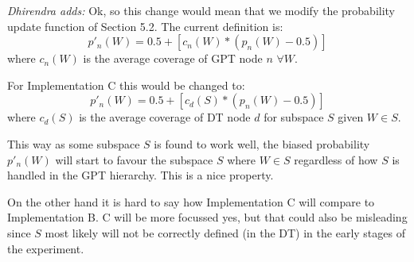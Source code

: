 \documentclass[10pt,a4paper]{article}
\begin{document}
\textit{Dhirendra adds:} Ok, so this change would mean that we modify the probability update function of Section 5.2. The current definition is:
\begin{equation}
\label{eqn:coverage1} 
p'_n(W)= 0.5 + \left[  c_n(W) *  \left( p_n(W) - 0.5 \right)  \right]
\end{equation} 
where $c_n(W)$ is the average coverage of GPT node $n$ $\forall W$.

For Implementation C this would be changed to:
\begin{equation}
\label{eqn:coverage2} 
p'_n(W)= 0.5 + \left[  c_d(S) *  \left( p_n(W) - 0.5 \right)  \right]
\end{equation}
where $c_d(S)$ is the average coverage of DT node $d$ for subspace $S$ given $W \in S$.

This way as some subspace $S$ is found to work well, the biased probability $p'_n(W)$ will start to favour the subspace $S$ where $W \in S$ regardless of how $S$ is handled in the GPT hierarchy. This is a nice property. 

On the other hand it is hard to say how Implementation C will compare to Implementation B. C will be more focussed yes, but that could also be misleading since $S$ most likely will not be correctly defined (in the DT) in the early stages of the experiment.
\end{document}
